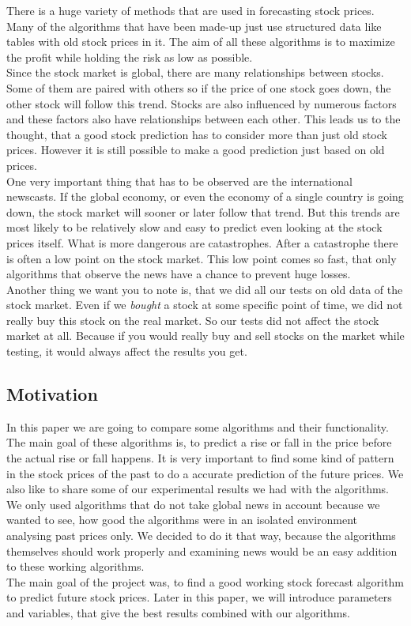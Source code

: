 \documentclass[conference]{IEEEtran}
\begin{document}
There is a huge variety of methods that are used in forecasting stock prices. Many of the algorithms that have been made-up just use structured data like tables with old stock prices in it. The aim of all these algorithms is to maximize the profit while holding the risk as low as possible.
\\
Since the stock market is global, there are many relationships between stocks. Some of them are paired with others so if the price of one stock goes down, the other stock will follow this trend.
Stocks are also influenced by numerous factors and these factors also have relationships between each other. This leads us to the thought, that a good stock prediction has to consider more than just old stock prices. However it is still possible to make a good prediction just based on old prices.
\\
One very important thing that has to be observed are the international newscasts. If the global economy, or even the economy of a single country is going down, the stock market will sooner or later follow that trend. But this trends are most likely to be relatively slow and easy to predict even looking at the stock prices itself. What is more dangerous are catastrophes. After a catastrophe there is often a low point on the stock market. This low point comes so fast, that only algorithms that observe the news have a chance to prevent huge losses.
\\
Another thing we want you to note is, that we did all our tests on old data of the stock market. Even if we \textit{bought} a stock at some specific point of time, we did not really buy this stock on the real market. So our tests did not affect the stock market at all. Because if you would really buy and sell stocks on the market while testing, it would always affect the results you get.

\subsection{Motivation}

In this paper we are going to compare some algorithms and their functionality. The main goal of these algorithms is, to predict a rise or fall in the price before the actual rise or fall happens. It is very important to find some kind of pattern in the stock prices of the past to do a accurate prediction of the future prices. We also like to share some of our experimental results we had with the algorithms. We only used algorithms that do not take global news in account because we wanted to see, how good the algorithms were in an isolated environment analysing past prices only. We decided to do it that way, because the algorithms themselves should work properly and examining news would be an easy addition to these working algorithms.
\\
The main goal of the project was, to find a good working stock forecast algorithm to predict future stock prices. Later in this paper, we will introduce parameters and variables, that give the best results combined with our algorithms.
\end{document}
